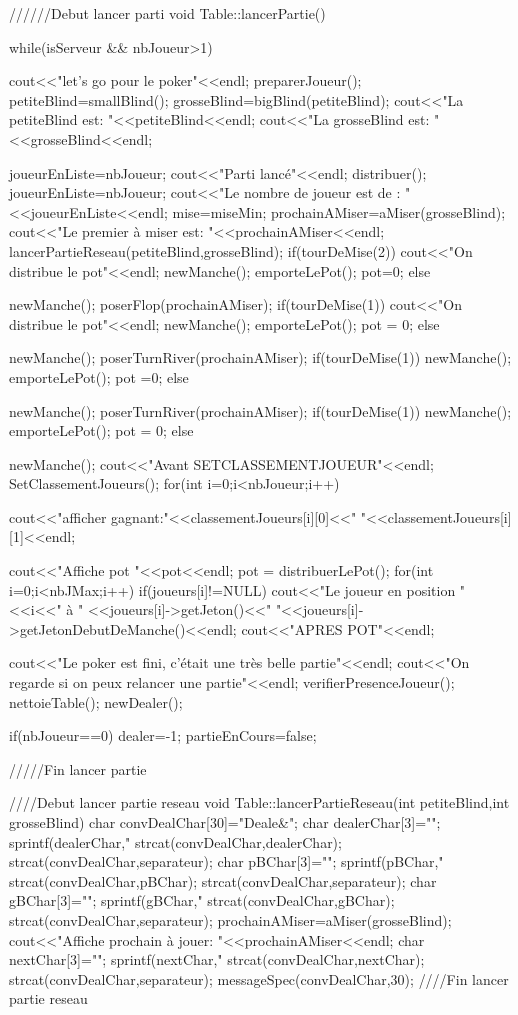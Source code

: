 \documentclass{article}
\begin{document}
//////Debut lancer parti
void Table::lancerPartie(){
  while(isServeur && nbJoueur>1){
    cout<<"let's go pour le poker"<<endl;
    preparerJoueur();
    petiteBlind=smallBlind();
    grosseBlind=bigBlind(petiteBlind);
    cout<<"La petiteBlind est: "<<petiteBlind<<endl;
    cout<<"La grosseBlind est: "<<grosseBlind<<endl;

    joueurEnListe=nbJoueur;
    cout<<"Parti lancé"<<endl;
    distribuer();
    joueurEnListe=nbJoueur;
    cout<<"Le nombre de joueur est de : " <<joueurEnListe<<endl;
    mise=miseMin;
    prochainAMiser=aMiser(grosseBlind);
    cout<<"Le premier à miser est: "<<prochainAMiser<<endl;
    lancerPartieReseau(petiteBlind,grosseBlind);
    if(tourDeMise(2)){
      cout<<"On distribue le pot"<<endl;
      newManche();
      emporteLePot();
      pot=0;
    }
    else{
      newManche();
      poserFlop(prochainAMiser);
      if(tourDeMise(1)){
	cout<<"On distribue le pot"<<endl;
	newManche();
        emporteLePot();
	pot = 0;
      }
      else{
	newManche();
	poserTurnRiver(prochainAMiser);
	if(tourDeMise(1)){
	  newManche();
	  emporteLePot();
	  pot =0;
	}
	else{
	  newManche();
	  poserTurnRiver(prochainAMiser);
	  if(tourDeMise(1)){
	    newManche();
	    emporteLePot();
	    pot = 0;
	  }
	  else{
	    newManche();
	    cout<<"Avant SETCLASSEMENTJOUEUR"<<endl;
	    SetClassementJoueurs();
	    for(int i=0;i<nbJoueur;i++){
	      
	      cout<<"afficher gagnant:"<<classementJoueurs[i][0]<<" "<<classementJoueurs[i][1]<<endl;
	    }
	    cout<<"Affiche pot "<<pot<<endl;
	    pot = distribuerLePot();
	    for(int i=0;i<nbJMax;i++){
	      if(joueurs[i]!=NULL){
		cout<<"Le joueur en position "<<i<<" à " <<joueurs[i]->getJeton()<<" "<<joueurs[i]->getJetonDebutDeManche()<<endl;
	      }
	    }
	    cout<<"APRES POT"<<endl;
	  }
	}
      }
    }
    cout<<"Le poker est fini, c'était une très belle partie"<<endl;
    cout<<"On regarde si on peux relancer une partie"<<endl;
    verifierPresenceJoueur();
    nettoieTable();
    newDealer();
  }
  if(nbJoueur==0)
    dealer=-1;
  partieEnCours=false;
}
/////Fin lancer partie

////Debut lancer partie reseau
void Table::lancerPartieReseau(int petiteBlind,int grosseBlind){
  char convDealChar[30]="Deale&";
  char dealerChar[3]="";
  sprintf(dealerChar,"%
  strcat(convDealChar,dealerChar);
  strcat(convDealChar,separateur);
  char pBChar[3]="";
  sprintf(pBChar,"%
  strcat(convDealChar,pBChar);
  strcat(convDealChar,separateur);
  char gBChar[3]="";
  sprintf(gBChar,"%
  strcat(convDealChar,gBChar);
  strcat(convDealChar,separateur);
  prochainAMiser=aMiser(grosseBlind);
  cout<<"Affiche prochain à jouer: "<<prochainAMiser<<endl;
  char nextChar[3]="";
  sprintf(nextChar,"%
  strcat(convDealChar,nextChar);
  strcat(convDealChar,separateur);
  messageSpec(convDealChar,30);
}
////Fin lancer partie reseau
\end{document}

